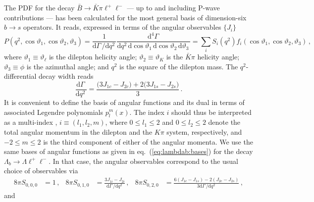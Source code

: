 \documentclass[aps,prd,reprint,nofootinbib,preprintnumbers]{revtex4}
\newcommand{\refeq}[1]{eq.~(\ref{eq:#1})}
\newcommand{\rmdx}[1]{\mbox{d} #1 \,} %
\renewcommand{\theta}{\vartheta}
\begin{document}
The PDF for the decay $\bar{B}\to\bar{K}\pi\ell^+\ell^-$ --- up to and including P-wave contributions --- has been calculated
for the most general basis of dimension-six $b\to s$ operators. It reads, expressed in terms of the angular observables $\lbrace J_i\rbrace$ \cite{Blake:2012mb,Bobeth:2012vn}
\begin{equation}
    P(q^2, \cos\theta_1, \cos\theta_2, \theta_3) = \frac{1}{\rmdx{\Gamma}/\rmdx{q^2}} \frac{\rmdx{^4\Gamma}}{\rmdx{q^2} \rmdx{\cos\theta_1} \rmdx{\cos\theta_2} \rmdx{\theta_3}}
    = \sum_i S_i(q^2) f_i(\cos\theta_1, \cos\theta_2, \theta_3)\,,
\end{equation}
where $\theta_1 \equiv \theta_\ell$ is the dilepton helicity angle; $\theta_2 \equiv \theta_{K}$ is the $\bar{K}\pi$ helicity angle; $\theta_3 \equiv \phi$ is the azimuthal angle;
and $q^2$ is the square of the dilepton mass. The $q^2$-differential decay width reads
\begin{equation}
    \frac{\rmdx{\Gamma}}{\rmdx{q^2}} = \frac{\big(3 J_{1c} - J_{2c}\big) + 2\big(3J_{1s} - J_{2s}\big)}{3}\,.
\end{equation}
It is convenient to define the basis of angular functions and its dual in terms of
associated Legendre polynomials $p_l^m(x)$. The index $i$ should thus be interpreted as a multi-index
, $i \equiv (l_1, l_2, m)$, where $0 \leq l_1 \leq 2$ and $0 \leq l_2 \leq 2$ denote the total angular
momentum in the dilepton and the $K\pi$ system, respectively, and $-2 \leq m \leq 2$
is the third component of either of the angular momenta.
We use the same bases of angular functions as given in \refeq{lambdab:bases} for the decay $\Lambda_b\to \Lambda\ell^+\ell^-$.
In that case, the angular observables correspond to the usual choice of observables via
\begin{equation}
\begin{aligned}
    8\pi S_{0, 0,  0} & = 1\,,                                                                             &
    8\pi S_{0, 1,  0} & = \frac{3 J_{1i} - J_{2i}}{\rmdx{\Gamma}/\rmdx{q^2}}\,,                            &
    8\pi S_{0, 2,  0} & = \frac{6 (J_{1c} - J_{1s}) - 2(J_{2c} - J_{2s})}{3\rmdx{\Gamma}/\rmdx{q^2}}\,,
\end{aligned}
\end{equation}
and
\end{document}
